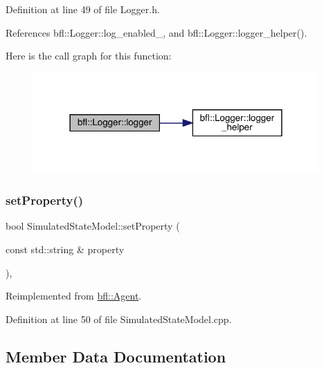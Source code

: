Definition at line 49 of file Logger.\+h.



References bfl\+::\+Logger\+::log\+\_\+enabled\+\_\+, and bfl\+::\+Logger\+::logger\+\_\+helper().

Here is the call graph for this function\+:
\nopagebreak
\begin{figure}[H]
\begin{center}
\leavevmode
\includegraphics[width=309pt]{classbfl_1_1Logger_a0f0cf7ce956546d94dfb1feb7cebf171_cgraph}
\end{center}
\end{figure}
\mbox{\label{classbfl_1_1SimulatedStateModel_ab629cfc5e8db969760f5fa161a1cf360}} 
\subsubsection{\texorpdfstring{set\+Property()}{setProperty()}}
{\footnotesize\ttfamily bool Simulated\+State\+Model\+::set\+Property (\begin{DoxyParamCaption}\item[{const std\+::string \&}]{property }\end{DoxyParamCaption})\hspace{0.3cm}{\ttfamily [override]}, {\ttfamily [virtual]}}



Reimplemented from \mbox{\hyperlink{classbfl_1_1Agent_a1291dcb438c8fc1400e1728711302007}{bfl\+::\+Agent}}.



Definition at line 50 of file Simulated\+State\+Model.\+cpp.



\subsection{Member Data Documentation}
\mbox{\label{classbfl_1_1SimulatedStateModel_ae81c0eee264cc44d0387662569c99b9e}} 

